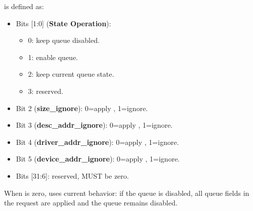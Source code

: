  is defined as:
\begin{itemize}
  \item Bits [1:0] (\textbf{State Operation}):
    \begin{itemize}
      \item 0: keep queue disabled.
      \item 1: enable queue.
      \item 2: keep current queue state.
      \item 3: reserved.
    \end{itemize}
  \item Bit 2 (\textbf{size\_ignore}): 0=apply , 1=ignore.
  \item Bit 3 (\textbf{desc\_addr\_ignore}): 0=apply ,
        1=ignore.
  \item Bit 4 (\textbf{driver\_addr\_ignore}): 0=apply ,
        1=ignore.
  \item Bit 5 (\textbf{device\_addr\_ignore}): 0=apply ,
        1=ignore.
  \item Bits [31:6]: reserved, MUST be zero.
\end{itemize}

When  is zero,  uses current behavior:
if the queue is disabled, all queue fields in the request are applied and the
queue remains disabled.

